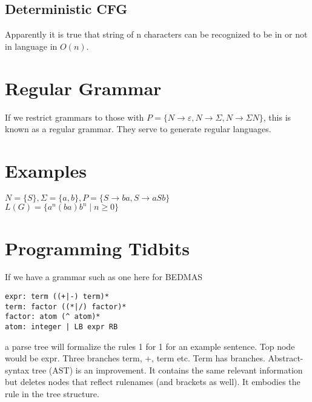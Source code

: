 \documentclass[a4paper]{scrartcl}
\begin{document}
\subsection{Deterministic CFG}
Apparently it is true that string of n characters can be recognized to be in or not in language in $O(n)$.

\section{Regular Grammar}
If we restrict grammars to those with $P = \{ N \rightarrow \varepsilon, N \rightarrow \Sigma, N \rightarrow \Sigma N \}$, this is known as a regular grammar. They serve to generate regular languages.\\

\section{Examples}
$N = \{ S \}, \Sigma = \{ a, b\}, P = \{ S\rightarrow ba, S\rightarrow aSb \}$ \\
$L(G) = \{ a^n(ba)b^n \mid n\geq 0 \}$

\section{Programming Tidbits}
If we have a grammar such as one here for BEDMAS
\begin{lstlisting}
expr: term ((+|-) term)*
term: factor ((*|/) factor)*
factor: atom (^ atom)*
atom: integer | LB expr RB
\end{lstlisting}
a parse tree will formalize the rules 1 for 1 for an example sentence. Top node would be expr. Three branches term, +, term etc. Term has branches. 
Abstract-syntax tree (AST) is an improvement. It contains the same relevant information but deletes nodes that reflect rulenames (and brackets as well). It embodies the rule in the tree structure.  
\end{document}
